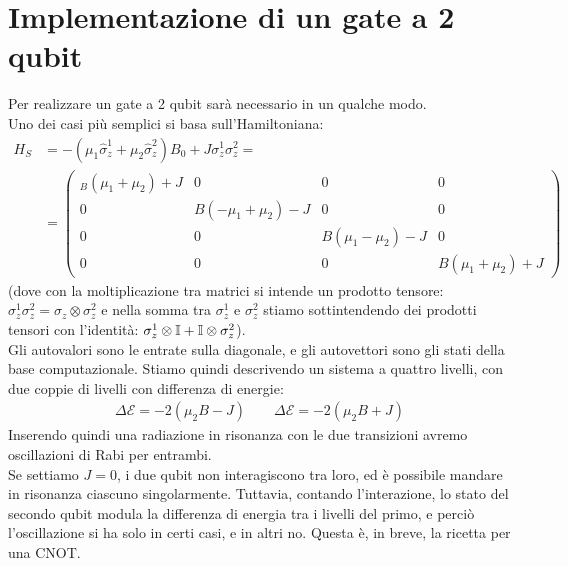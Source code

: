\documentclass[../../InformazioneQuantistica.tex]{subfiles}
\begin{document}

\section{Implementazione di un gate a 2 qubit} 
Per realizzare un gate a 2 qubit sarà necessario  in un qualche modo.\\
Uno dei casi più semplici si basa sull'Hamiltoniana:
\begin{align*}
H_S &= -(\mu_1 \hat{\sigma}_z^1 + \mu_2 \hat{\sigma}_z^2 )B_0 + J \sigma_z^1 \sigma_z^2  =\\
&= \begin{pmatrix}
_B(\mu_1+\mu_2)+J & 0 & 0 & 0\\
0 & B(-\mu_1+\mu_2)- J & 0 & 0\\
0 & 0 & B(\mu_1-\mu_2)-J & 0\\
0 & 0 & 0 & B(\mu_1 + \mu_2) + J
\end{pmatrix}
\end{align*}
(dove con la moltiplicazione tra matrici si intende un prodotto tensore: $\sigma_z^1 \sigma_z^2 = \sigma_z \otimes \sigma_z^2$ e nella somma tra $\sigma_z^1$ e $\sigma_z^2$ stiamo sottintendendo dei prodotti tensori con l'identità: $\sigma_z^1\otimes \mathbb{I} + \mathbb{I}\otimes \sigma_z^2$).\\
Gli autovalori sono le entrate sulla diagonale, e gli autovettori sono gli stati della base computazionale. Stiamo quindi descrivendo un sistema a quattro livelli, con due coppie di livelli con differenza di energie:
\begin{align*}
\Delta \mathcal{E} = - 2(\mu_2 B - J) \qquad \Delta\mathcal{E} = -2(\mu_2 B + J)
\end{align*}
Inserendo quindi una radiazione in risonanza con le due transizioni avremo oscillazioni di Rabi per entrambi.\\
Se settiamo $J=0$, i due qubit non interagiscono tra loro, ed è possibile mandare in risonanza ciascuno singolarmente. Tuttavia, contando l'interazione, lo stato del secondo qubit modula la differenza di energia tra i livelli del primo, e perciò l'oscillazione si ha solo in certi casi, e in altri no. Questa è, in breve, la ricetta per una CNOT.
\end{document}
